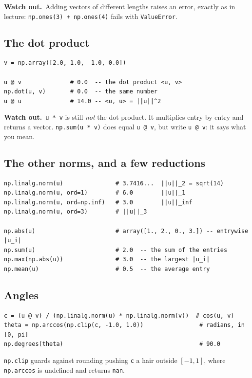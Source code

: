 \documentclass[11pt]{article}
\newcommand{\heads}[1]{\par\smallskip\noindent
  {\small\sffamily\textcolor{BrickRed}{\textbf{Watch out.}}\ #1}\par\smallskip}
\begin{document}
\heads{Adding vectors of different lengths raises an error, exactly as in
lecture: \texttt{np.ones(3) + np.ones(4)} fails with \texttt{ValueError}.}

\subsection{The dot product}

\begin{lstlisting}
v = np.array([2.0, 1.0, -1.0, 0.0])

u @ v              # 0.0  -- the dot product <u, v>
np.dot(u, v)       # 0.0  -- the same number
u @ u              # 14.0 -- <u, u> = ||u||^2
\end{lstlisting}

\heads{\texttt{u * v} is still \emph{not} the dot product. It multiplies entry by
entry and returns a vector. \texttt{np.sum(u * v)} does equal \texttt{u @ v},
but write \texttt{u @ v}: it says what you mean.}

\subsection{The other norms, and a few reductions}

\begin{lstlisting}
np.linalg.norm(u)               # 3.7416...  ||u||_2 = sqrt(14)
np.linalg.norm(u, ord=1)        # 6.0        ||u||_1
np.linalg.norm(u, ord=np.inf)   # 3.0        ||u||_inf
np.linalg.norm(u, ord=3)        # ||u||_3

np.abs(u)                       # array([1., 2., 0., 3.]) -- entrywise |u_i|
np.sum(u)                       # 2.0  -- the sum of the entries
np.max(np.abs(u))               # 3.0  -- the largest |u_i|
np.mean(u)                      # 0.5  -- the average entry
\end{lstlisting}

\subsection{Angles}

\begin{lstlisting}
c = (u @ v) / (np.linalg.norm(u) * np.linalg.norm(v))  # cos(u, v)
theta = np.arccos(np.clip(c, -1.0, 1.0))                # radians, in [0, pi]
np.degrees(theta)                                       # 90.0
\end{lstlisting}

\noindent \texttt{np.clip} guards against rounding pushing \texttt{c} a hair
outside $[-1,1]$, where \texttt{np.arccos} is undefined and returns
\texttt{nan}.
\end{document}
